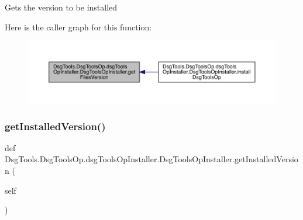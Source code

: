\begin{DoxyVerb}Gets the version to be installed
\end{DoxyVerb}
 Here is the caller graph for this function\+:
\nopagebreak
\begin{figure}[H]
\begin{center}
\leavevmode
\includegraphics[width=350pt]{class_dsg_tools_1_1_dsg_tools_op_1_1dsg_tools_op_installer_1_1_dsg_tools_op_installer_a8e22feebedd9477ba954a452c2164c4e_icgraph}
\end{center}
\end{figure}
\mbox{\label{class_dsg_tools_1_1_dsg_tools_op_1_1dsg_tools_op_installer_1_1_dsg_tools_op_installer_a5bc63c03ccc06ea353edf4ccf5999564}} 
\subsubsection{\texorpdfstring{get\+Installed\+Version()}{getInstalledVersion()}}
{\footnotesize\ttfamily def Dsg\+Tools.\+Dsg\+Tools\+Op.\+dsg\+Tools\+Op\+Installer.\+Dsg\+Tools\+Op\+Installer.\+get\+Installed\+Version (\begin{DoxyParamCaption}\item[{}]{self }\end{DoxyParamCaption})}

